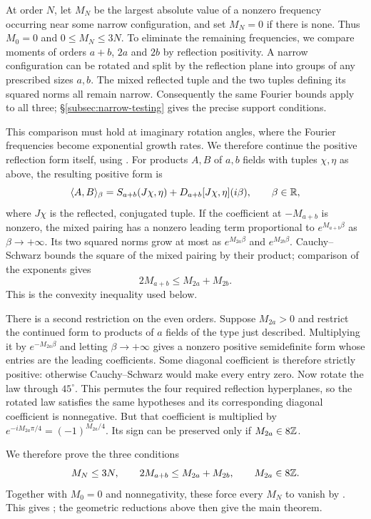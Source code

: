 At order $N$, let $M_N$ be the largest absolute value of a nonzero
frequency occurring near some narrow configuration, and set $M_N=0$
if there is none. Thus $M_0=0$ and $0\leq M_N\leq3N$.
To eliminate the remaining frequencies, we compare moments of orders
$a+b$, $2a$ and $2b$ by reflection positivity. A narrow configuration
can be rotated and split by the reflection plane into groups of any
prescribed sizes $a,b$. The mixed reflected tuple and the two tuples
defining its squared norms all remain narrow. Consequently the same
Fourier bounds apply to all three; \S\ref{subsec:narrow-testing}
gives the precise support conditions.

This comparison must hold at imaginary rotation angles, where the
Fourier frequencies become exponential growth rates. We therefore
continue the positive reflection form itself, using
. For products $A,B$ of $a,b$ fields
with tuples $\chi,\eta$ as above, the resulting positive form is
\[
 \langle A,B\rangle_\beta
 =S_{a+b}(J\chi,\eta)+D_{a+b}[J\chi,\eta](i\beta),
 \qquad\beta\in\mathbb{R},
\]
where $J\chi$ is the reflected, conjugated tuple. If the coefficient
at $-M_{a+b}$ is nonzero, the mixed pairing has a nonzero leading
term proportional to $e^{M_{a+b}\beta}$ as $\beta\to+\infty$.
Its two squared norms grow at most as $e^{M_{2a}\beta}$ and
$e^{M_{2b}\beta}$. Cauchy--Schwarz bounds the square of the mixed
pairing by their product; comparison of the exponents gives
\begin{equation}\label{eq:convexity-preview}
 2M_{a+b}\leq M_{2a}+M_{2b}.
\end{equation}
This is the convexity inequality used below.

There is a second restriction on the even orders. Suppose $M_{2a}>0$
and restrict the continued form to products of $a$ fields of the type
just described. Multiplying it by $e^{-M_{2a}\beta}$ and letting
$\beta\to+\infty$ gives a nonzero positive semidefinite form whose
entries are the leading coefficients. Some diagonal coefficient is
therefore strictly positive: otherwise Cauchy--Schwarz would
make every entry zero. Now rotate the law through $45^\circ$. This
permutes the four required reflection hyperplanes, so the rotated
law satisfies the same hypotheses and its corresponding diagonal
coefficient is nonnegative. But that coefficient is multiplied by
$e^{-iM_{2a}\pi/4}=(-1)^{M_{2a}/4}$. Its sign can be preserved only
if $M_{2a}\in8\mathbb{Z}$.

We therefore prove the three conditions
\[
 M_N\leq3N,\qquad 2M_{a+b}\leq M_{2a}+M_{2b},\qquad
 M_{2a}\in8\mathbb{Z}.
\]
Together with $M_0=0$ and nonnegativity, these force every $M_N$ to
vanish by . This gives ; the
geometric reductions above then give the main theorem.


